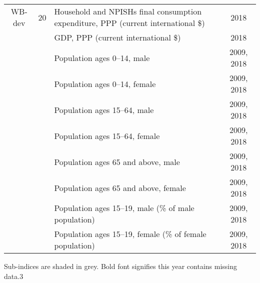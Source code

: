 {\begin{tabular}{cclc}
    WB-dev & 20    & Household and NPISHs final consumption expenditure, PPP (current international \$) & 2018 \\
          &       & GDP, PPP (current international \$) & 2018 \\
          &       & Population ages 0--14, male & 2009, 2018 \\
          &       & Population ages 0--14, female & 2009, 2018 \\
          &       & Population ages 15--64, male & 2009, 2018 \\
          &       & Population ages 15--64, female & 2009, 2018 \\
          &       & Population ages 65 and above, male & 2009, 2018 \\
          &       & Population ages 65 and above, female & 2009, 2018 \\
          &       & Population ages 15--19, male (\% of male population) & 2009, 2018 \\
          &       & Population ages 15--19, female (\% of female population) & 2009, 2018 \\
          \bottomrule
    \end{tabular}
}{Sub-indices are shaded in grey. Bold font signifies this year contains missing data.}{3}
\newpage

